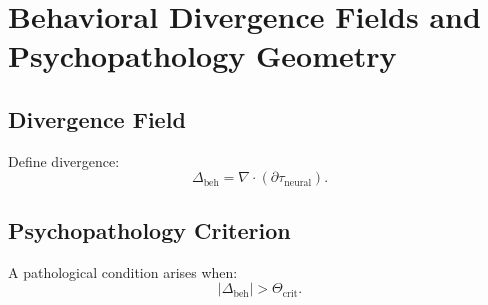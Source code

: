 \chapter{Behavioral Divergence Fields and Psychopathology Geometry}

\section{Divergence Field}
Define divergence:
\[
\Delta_{\mathrm{beh}} = \nabla \cdot (\partial\tau_{\mathrm{neural}}).
\]

\section{Psychopathology Criterion}
A pathological condition arises when:
\[
|\Delta_{\mathrm{beh}}| > \Theta_{\mathrm{crit}}.
\]

